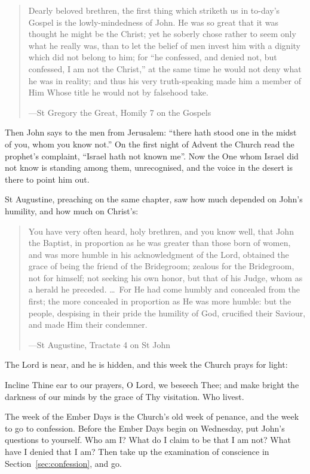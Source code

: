 \begin{quote}
Dearly beloved brethren, the first thing which striketh us in to-day's Gospel is
the lowly-mindedness of John. He was so great that it was thought he might be
the Christ; yet he soberly chose rather to seem only what he really was, than to
let the belief of men invest him with a dignity which did not belong to him; for
``he confessed, and denied not, but confessed, I am not the Christ,'' at the same
time he would not deny what he was in reality; and thus his very truth-speaking
made him a member of Him Whose title he would not by falsehood take.\par
{\smallskip\noindent\small ---St Gregory the Great, Homily 7 on the Gospels\par}
\end{quote}

Then John says to the men from Jerusalem: ``there hath stood one in the midst of
you, whom you know not.'' On the first night of Advent the Church read the
prophet's complaint, ``Israel hath not known me''. Now the One whom Israel did
not know is standing among them, unrecognised, and the voice in the desert is
there to point him out.

St Augustine, preaching on the same chapter, saw how much depended on John's
humility, and how much on Christ's:

\begin{quote}
You have very often heard, holy brethren, and you know well, that John the
Baptist, in proportion as he was greater than those born of women, and was more
humble in his acknowledgment of the Lord, obtained the grace of being the
friend of the Bridegroom; zealous for the Bridegroom, not for himself; not
seeking his own honor, but that of his Judge, whom as a herald he preceded.
\dots\ For He had come humbly and concealed from the first; the more concealed
in proportion as He was more humble: but the people, despising in their pride
the humility of God, crucified their Saviour, and made Him their condemner.\par
{\smallskip\noindent\small ---St Augustine, Tractate 4 on St John\par}
\end{quote}

The Lord is near, and he is hidden, and this week the Church prays for light:

\begin{studyframe}
\medskip

Incline Thine ear to our prayers, O Lord, we beseech Thee; and make bright the
darkness of our minds by the grace of Thy visitation. Who livest.\par
\end{studyframe}

The week of the Ember Days is the Church's old week of penance, and the week to
go to confession. Before the Ember Days begin on Wednesday, put John's
questions to yourself. Who am I? What do I claim to be that I am not? What have
I denied that I am? Then take up the examination of conscience in
Section~\ref{sec:confession}, and go.
